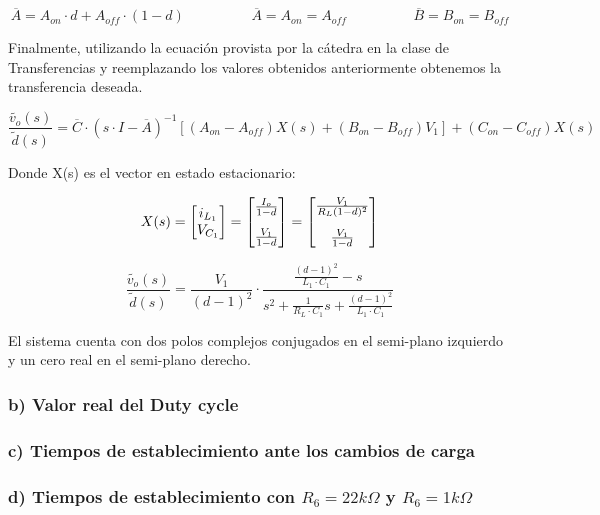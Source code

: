 \documentclass[e4_tp2_main.tex]{subfiles}
\begin{document}
\begin{equation}
\overline{A} = A_{on} \cdot d + A_{off} \cdot (1-d) \hspace{2cm} \overline{A}=A_{on} = A_{off}  \hspace{2cm} \overline{B}=B_{on} = B_{off}  
\end{equation}

Finalmente, utilizando la ecuaci\'on provista por la c\'atedra en la clase de Transferencias y reemplazando los valores obtenidos anteriormente obtenemos la transferencia deseada. 

\begin{equation}
\frac{ \widetilde{v_o}(s)}{\widetilde{d}(s)}= \overline{C} \cdot (s \cdot I - \overline{A})^{-1} \left[ (A_{on} - A_{off})X(s) + (B_{on} - B_{off}) V_1 \right] +(C_{on} - C_{off})X(s) 
\label{ec1.3}
\end{equation}

Donde X(s) es el vector en estado estacionario:

\begin{equation}
X(s)= 
\begin{bmatrix}
{i_{L_1}} \\
{V_{C_1}} 
\end{bmatrix}
=
\begin{bmatrix}
{\frac{I_o}{1-d}} \vspace{0.3cm} \\
{\frac{V_1}{1-d}} 
\end{bmatrix}
=
\begin{bmatrix}
{\frac{V_1}{R_L(1-d)^2}} \vspace{0.3cm} \\
{\frac{V_1}{1-d}} 
\end{bmatrix}
\end{equation}

\vspace{0.5cm}

\begin{equation}
\frac{ \widetilde{v_o}(s)}{\widetilde{d}(s)}= \frac{V_1}{(d-1)^2} \cdot
 \frac{\frac{(d-1)^2}{L_1 \cdot C_1} -s}{s^2 +\frac{1}{R_L \cdot C_1 } s + \frac{(d-1)^2}{L_1 \cdot C_1}}
\end{equation}

El sistema cuenta con dos polos complejos conjugados en el semi-plano izquierdo y un cero real en el semi-plano derecho.
\subsubsection*{b) Valor real del Duty cycle}

\subsubsection*{c) Tiempos de establecimiento ante los cambios de carga }
\subsubsection*{d) Tiempos de establecimiento con $R_6=22k\Omega$ y $R_6=1k\Omega$}
\end{document}
